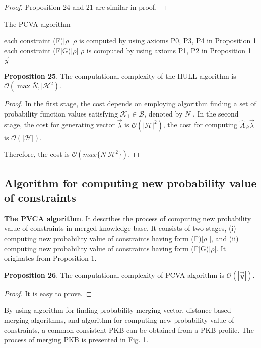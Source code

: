 \documentclass[]{iosart2c}
\begin{document}
\begin{proof}Proposition 24 and 21 are similar in proof.
\end{proof}
\begin{algorithm}
\caption{The PCVA algorithm}
\begin{algorithmic}[1]
\For each constraint (F)[$\rho$] 
  \State $\rho$ is computed by using axioms P0, P3, P4 in Proposition 1
\EndFor
\For each constraint (F|G)[$\rho$]
  \State $\rho$ is computed by using axioms P1, P2 in Proposition 1
\EndFor
\State \Return $\vec{y}$
\end{algorithmic}
\end{algorithm}

\textbf{Proposition 25}. The computational complexity of the
HULL algorithm is $\mathcal{O}(\max{\bar N, |\mathcal{H}^2})$.

\begin{proof}In the first stage, the cost depends on employing algorithm finding a set of probability function
values satisfying $\mathcal{K}_1 \in \mathcal{B}$, denoted by $\bar N$ . In the
second stage, the cost for generating vector $\vec{\lambda}$ is
$\mathcal{O}(|\mathcal{H}|^2)$, the cost for computing $\hat{A}_\mathcal{B}\vec{\lambda}$ is $\mathcal{O}(|\mathcal{H}|)$.

Therefore, the cost is $\mathcal{O}(max\{\bar N|\mathcal{H}^2\})$.
\end{proof}
\subsection{Algorithm for computing new probability value of constraints}

\textbf{The PVCA algorithm}. It describes the process of computing new probability value of constraints in merged knowledge base. It consists of two stages, (i) computing new probability value of constraints having form (F)[$\rho$ ], and (ii) computing new probability value of constraints having form (F|G)[$\rho$]. It originates from Proposition 1.

\textbf{Proposition 26}. The computational complexity of PCVA algorithm is $\mathcal{O}(|\vec{y} |)$.

\begin{proof}
It is easy to prove. 
\end{proof}

By using algorithm for finding probability merging vector, distance-based merging algorithms, and algorithm for computing new probability value of constraints, a common consistent PKB can be obtained from a PKB profile. The process of merging PKB is presented in Fig. 1.
\end{document}
